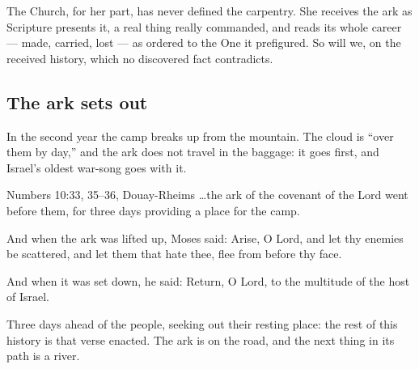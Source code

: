 The Church, for her part, has never defined the carpentry. She receives
the ark as Scripture presents it, a real thing really commanded, and reads
its whole career --- made, carried, lost --- as ordered to the One it
prefigured. So will we, on the received history, which no discovered fact
contradicts.

\subsection{The ark sets out}

In the second year the camp breaks up from the mountain. The cloud is
``over them by day,'' and the ark does not travel in the baggage: it goes
first, and Israel's oldest war-song goes with it.

\begin{witnessbox}{Numbers 10:33, 35--36, Douay-Rheims}
\ldots{}the ark of the covenant of the Lord went before them, for three
days providing a place for the camp.

And when the ark was lifted up, Moses said: Arise, O Lord, and let thy
enemies be scattered, and let them that hate thee, flee from before thy
face.

And when it was set down, he said: Return, O Lord, to the multitude of the
host of Israel.
\end{witnessbox}

Three days ahead of the people, seeking out their resting place: the rest
of this history is that verse enacted. The ark is on the road, and the next
thing in its path is a river.
